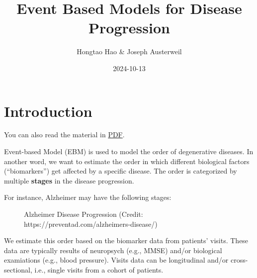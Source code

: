 \documentclass[
  letterpaper,
  DIV=11,
  numbers=noendperiod]{scrreprt}
\title{Event Based Models for Disease Progression}
\author{Hongtao Hao \& Joseph Austerweil}
\date{2024-10-13}
\renewcommand*\contentsname{Table of contents}
\newcommand\contentsname{Table of contents}
\begin{document}
\maketitle

\renewcommand*\contentsname{Table of contents}
{
\hypersetup{linkcolor=}
\setcounter{tocdepth}{2}
\tableofcontents
}


\chapter{Introduction}\label{introduction}

You can also read the material in
\href{Event-Based-Models-for-Disease-Progression.pdf}{PDF}.

Event-based Model (EBM) is used to model the order of degenerative
diseases. In another word, we want to estimate the order in which
different biological factors (``biomarkers'') get affected by a specific
disease. The order is categorized by multiple \textbf{stages} in the
disease progression.

For instance, Alzheimer may have the following stages:

\begin{figure}


\caption{\label{fig-ad-progression}Alzheimer Disease Progression
(Credit: https://preventad.com/alzheimers-disease/)}

\end{figure}%

We estimate this order based on the biomarker data from patients'
visits. These data are typically results of neuropsych (e.g., MMSE)
and/or biological examiations (e.g., blood pressure). Visits data can be
longitudinal and/or cross-sectional, i.e., single visits from a cohort
of patients.
\end{document}
